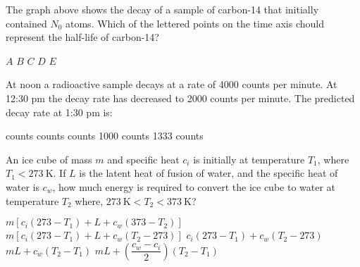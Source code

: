 \documentclass[12pt]{exam}
\begin{document}
\begin{questions}
  
  \question The graph above shows the decay of a sample of carbon-14 that
  initially contained $N_0$ atoms.  Which of the lettered points on the time
  axis chould represent the half-life of carbon-14?
  \begin{choices}
    \choice $A$
    \choice $B$
    \choice $C$
    \choice $D$
    \choice $E$
  \end{choices}

  \question At noon a radioactive sample decays at a rate of \num{4000} counts
  per minute. At 12:30 pm the decay rate has decreased to \num{2000} counts per
  minute. The predicted decay rate at 1:30 pm is:
  \begin{choices}
     counts
     counts
     counts
    \choice \num{1000} counts
    \choice \num{1333} counts
  \end{choices}

  \question An ice cube of mass $m$ and specific heat $c_i$ is initially at
  temperature $T_1$, where $T_1<\SI{273}{\kelvin}$. If $L$ is the latent heat
  of fusion of water, and the specific heat of water is $c_w$, how much energy
  is required to convert the ice cube to water at temperature $T_2$ where,
  $\SI{273}{\kelvin}<T_2<\SI{373}{\kelvin}$?
  \begin{choices}
    \choice $m[c_i(273-T_1)+L+c_w(373-T_2)]$
    \choice $m[c_i(273-T_1)+L+c_w(T_2-273)]$
    \choice $c_i(273-T_1)+c_w(T_2-273)$
    \choice $mL+c_w(T_2-T_1)$
    \choice $mL+\left(\dfrac{c_w-c_i}{2}\right)(T_2-T_1)$
  \end{choices}
\end{questions}
\end{document}
